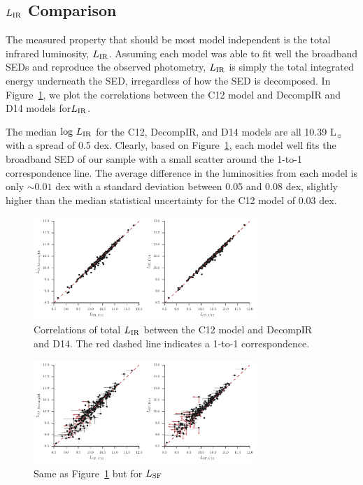 \documentclass[fleqn, usenatbib]{mnras}
\newcommand{\lsun}{L$_{\sun}$}
\begin{document}
\subsection{$L_{\rm IR}$ Comparison}
The measured property that should be most model independent is the total infrared luminosity, $L_{\rm IR}$. Assuming each model was able to fit well the broadband SEDs and reproduce the observed photometry, $L_{\rm IR}$ is simply the total integrated energy underneath the SED, irregardless of how the SED is decomposed. In Figure~\ref{fig:lir_total_comp}, we plot the correlations between the C12 model and DecompIR and D14 models for$L_{\rm IR}$.  

The median $\log\,L_{\rm IR}$ for the C12, DecompIR, and D14 models are all 10.39 \lsun with a spread of 0.5 dex. Clearly, based on Figure~\ref{fig:lir_total_comp}, each model well fits the broadband SED of our sample with a small scatter around the 1-to-1 correspondence line. The average difference in the luminosities from each model is only $\sim0.01$ dex with a standard deviation between 0.05 and 0.08 dex, slightly higher than the median statistical uncertainty for the C12 model of 0.03 dex.  

\begin{figure}
\includegraphics[width=0.75\textwidth]{figures/lir_total-comparison_nokde}
\caption{Correlations of total $L_{\rm IR}$ between the C12 model and DecompIR and D14. The red dashed line indicates a 1-to-1 correspondence.\label{fig:lir_total_comp}}
\end{figure}

\begin{figure}
\includegraphics[width=0.75\textwidth]{figures/lir_sf-comparison_nokde}
\caption{Same as Figure~\ref{fig:lir_total_comp} but for $L_{\rm SF}$ \label{fig:lir_sf_comp}}
\end{figure}
\end{document}
